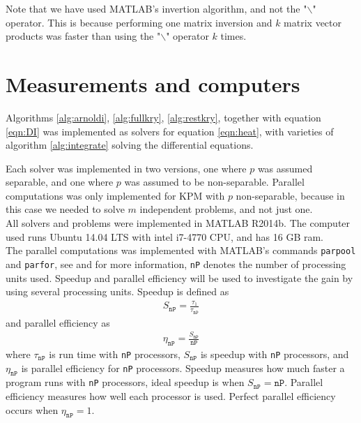 Note that we have used MATLAB's invertion algorithm, and not the "$\backslash$" operator. This is because performing one matrix inversion and $k$ matrix vector products was faster than using the "$\backslash$" operator $k$ times.

\section{Measurements and computers} \label{sec:not}
Algorithms \ref{alg:arnoldi}, \ref{alg:fullkry}, \ref{alg:restkry}, together with equation \ref{eqn:DI} was implemented as solvers for equation \ref{eqn:heat}, with varieties of algorithm \ref{alg:integrate} solving the differential equations. 

Each solver was implemented in two versions, one where $p$ was assumed separable, and one where $p$ was assumed to be non-separable. Parallel computations was only implemented for KPM with $p$ non-separable, because in this case we needed to solve $m$ independent problems, and not just one.\\ %

All solvers and problems were implemented in MATLAB R2014b. The computer used runs Ubuntu 14.04 LTS with intel  i7-4770 CPU, and has 16 GB ram. \\

The parallel computations was implemented with MATLAB's commands \texttt{parpool} and \texttt{parfor}, see \cite{parpool} and \cite{parfor} for more information, \texttt{nP} denotes the number of processing units used. Speedup and parallel efficiency will be used to investigate the gain by using several processing units. Speedup is defined as
\begin{align*}
S_\texttt{nP} = \frac{\tau_1}{\tau_\texttt{nP}}
\end{align*}
and parallel efficiency as
\begin{align*}
\eta_\texttt{nP} = \frac{S_\texttt{nP}}{\texttt{nP}}
\end{align*}
where $\tau_\texttt{nP}$ is run time with \texttt{nP} processors, $S_\texttt{nP}$ is speedup with \texttt{nP} processors, and $\eta_\texttt{nP}$ is parallel efficiency for \texttt{nP} processors. Speedup measures how much faster a program runs with \texttt{nP} processors, ideal speedup is when $S_\texttt{nP} = \texttt{nP}$. Parallel efficiency measures how well each processor is used. Perfect parallel efficiency occurs when $\eta_\texttt{nP} = 1$.\\

